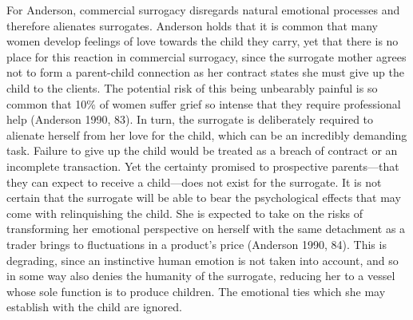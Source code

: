 For Anderson, commercial
surrogacy disregards natural emotional processes and therefore alienates
surrogates. Anderson holds that it is common that many women develop
feelings of love towards the child they carry, yet that there is no
place for this reaction in commercial surrogacy, since the surrogate
mother agrees not to form a parent-child connection as her contract
states she must give up the child to the clients. The potential risk of
this being unbearably painful is so common that 10\% of women suffer
grief so intense that they require professional help (Anderson 1990,
83). In turn, the surrogate is deliberately required to alienate herself
from her love for the child, which can be an incredibly demanding task.
Failure to give up the child would be treated as a breach of contract or
an incomplete transaction. Yet the certainty promised to prospective
parents---that they can expect to receive a child---does not exist for
the surrogate. It is not certain that the surrogate will be able to bear
the psychological effects that may come with relinquishing the child.
She is expected to take on the risks of transforming her emotional
perspective on herself with the same detachment as a trader brings to
fluctuations in a product's price (Anderson 1990, 84). This is degrading, since
an instinctive human emotion is not taken into account, and so in some
way also denies the humanity of the surrogate, reducing her to a
vessel whose sole function is to produce children. The emotional ties
which she may establish with the child are ignored. 

